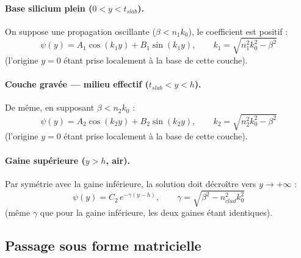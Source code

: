 \documentclass[a4paper,11pt]{report}
\begin{document}
\paragraph{Base silicium plein ($0<y<t_{slab}$).} On suppose une propagation oscillante ($\beta<n_1k_0$), le coefficient est positif :
\begin{equation}
\psi(y) = A_1\cos(k_1y) + B_1\sin(k_1y), \qquad k_1=\sqrt{n_1^2k_0^2-\beta^2}
\end{equation}
(l'origine $y=0$ étant prise localement à la base de cette couche).

\paragraph{Couche gravée --- milieu effectif ($t_{slab}<y<h$).} De même, en supposant $\beta<n_2k_0$ :
\begin{equation}
\psi(y) = A_2\cos(k_2y) + B_2\sin(k_2y), \qquad k_2=\sqrt{n_2^2k_0^2-\beta^2}
\end{equation}
(l'origine $y=0$ étant prise localement à la base de cette couche).

\paragraph{Gaine supérieure ($y>h$, air).} Par symétrie avec la gaine inférieure, la solution doit décroître vers $y\to+\infty$ :
\begin{equation}
\psi(y) = C_2\,e^{-\gamma(y-h)}, \qquad \gamma = \sqrt{\beta^2-n_{clad}^2k_0^2}
\end{equation}
(même $\gamma$ que pour la gaine inférieure, les deux gaines étant identiques).

\subsection*{Passage sous forme matricielle}
\end{document}
